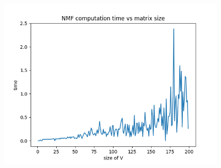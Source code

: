 \documentclass[a4paper,11pt]{article}
\begin{document}
\begin{figure}[H]
    \begin{center}
        \includegraphics[scale=0.7]{../../results/time_results.png}  
    \end{center}
\end{figure}





\end{document}
